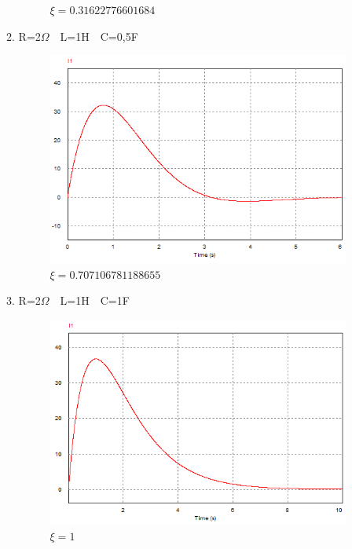 \documentclass[titlepage, a4paper, 11pt, reqno, openany]{report}
\begin{document}
\begin{enumerate}
\begin{enumerate}
\begin{figure}[H]
\caption{$\xi=0.31622776601684$}
\label{figura 25}
\end{figure}\par
\item
R=2$\Omega$\ \  L=1H\ \  C=0,5F\par
\begin{figure}[H]
\centering
\includegraphics[scale=1]{./image/PSIM_14.png}
\caption{$\xi=0.707106781188655$}
\label{figura 26}
\end{figure}\par
\item
R=2$\Omega$\ \  L=1H\ \  C=1F\par
\begin{figure}[H]
\centering
\includegraphics[scale=1]{./image/PSIM_15.png}
\caption{$\xi=1$}
\label{figura 27}
\end{figure}\par

\end{enumerate}
\end{enumerate}
\end{document}
